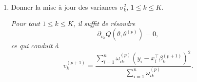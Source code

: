 \documentclass[a4paper,10pt,fleqn]{article}
\newcommand{\1}{\ensuremath{\mathbbm{1}}}
\begin{document}
\begin{enumerate}
\vspace{.2cm}
{\em
On remarque que la maximisation de la quantit\'e interm\'ediare par rapport aux coefficients de r\'egression revient \`a la r\'esolution d'un probl\`eme de moindres carr\'es pond\'er\'es. En introduisant $X$ la matrice de $\mathbb{R}^{n\times d}$ telle que la $i$-\`eme ligne de $X$ est $x_i^\top$, $y = (y_1,\ldots,y_n)^\top$ et $W_k = \mathrm{diag}( \omega_{1k}^{(p)},\ldots, \omega_{nk}^{(p)})$, on souhaite r\'esoudre
$$
(X^\top W_k X) \beta_k = X^\top W_k y,
$$
ce qui conduit \`a
$$
\beta_k^{(p+1)} = (X^\top W_k X)^{-1}X^\top W_k y.
$$
}
\item Donner la mise \`a jour des variances $\sigma_k^2$,  $1\leq k \leq K$.

\vspace{.2cm}
{\em
Pour tout $1\leq k \leq K$, il suffit de r\'esoudre
$$
\partial_{v_k} Q(\theta,\theta^{(p)}) = 0,
$$
ce qui conduit \`a
$$
v_k^{(p+1)} = \frac{\sum_{i=1}^n \omega_{ik}^{(p)}\left(y_i - x_i^\top \beta_k^{(p+1)}\right)^2}{\sum_{i=1}^n \omega_{ik}^{(p)}}.
$$
}
\end{enumerate}
\end{document}
